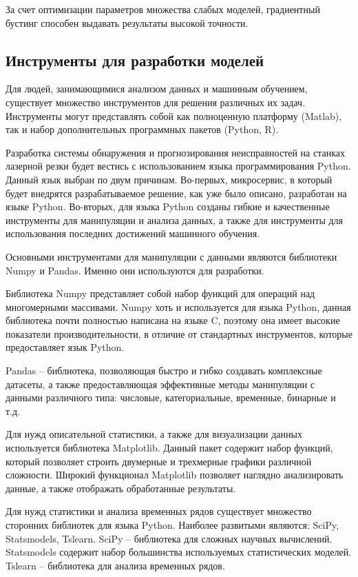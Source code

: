 За счет оптимизации параметров множества слабых моделей,
градиентный бустинг способен выдавать результаты высокой точности.


\subsection{Инструменты для разработки моделей}

Для людей, занимающимися
анализом данных и машинным обучением,
существует множество инструментов для решения
различных их задач.
Инструменты могут представлять собой
как полноценную платформу (Matlab),
так и набор дополнительных программных пакетов (Python, R).

Разработка системы обнаружения
и прогнозирования неисправностей на станках лазерной резки
будет вестись с использованием языка программирования Python.
Данный язык выбран по двум причинам.
Во-первых, микросервис, в который будет внедрятся разрабатываемое решение,
как уже было описано, разработан на языке Python.
Во-вторых, для языка Python созданы гибкие и качественные
инструменты для манипуляции и анализа данных,
а также для инструменты для использования
последних достижений машинного обучения.

Основными инструментами для манипуляции с данными
являются библиотеки Numpy и Pandas.
Именно они используются для разработки.

Библиотека Numpy представляет собой
набор функций для операций над многомерными массивами.
Numpy хоть и используется для языка Python,
данная библиотека почти полностью написана на языке C,
поэтому она имеет высокие показатели производительности,
в отличие от стандартных инструментов,
которые предоставляет язык Python.

Pandas -- библиотека, позволяющая
быстро и гибко создавать комплексные датасеты,
а также предоставляющая эффективные методы
манипуляции с данными различного типа:
числовые, категориальные, временные, бинарные и т.д.

Для нужд описательной статистики,
а также для визуализации данных
используется библиотека Matplotlib.
Данный пакет содержит набор функций,
который позволяет строить двумерные
и трехмерные графики различной сложности.
Широкий функционал Matplotlib позволяет
наглядно анализировать данные,
а также отображать обработанные результаты.

Для нужд статистики и анализа временных рядов
существует множество сторонних библиотек для языка Python.
Наиболее развитыми являются: SciPy, Statsmodels, Tslearn.
SciPy -- библиотека для сложных научных вычислений.
Statsmodels содержит набор большинства используемых статистических моделей.
Tslearn -- библиотека для анализа временных рядов.

